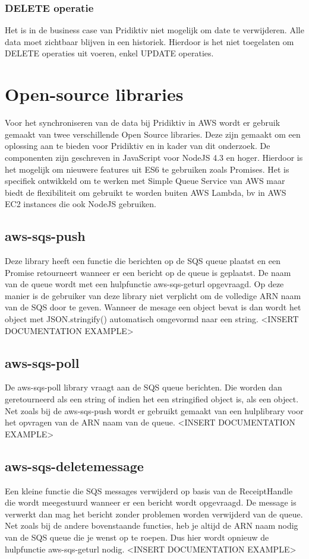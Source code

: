 \subsubsection{DELETE operatie}
Het is in de business case van Pridiktiv niet mogelijk om date te verwijderen. Alle data moet zichtbaar blijven in een historiek. Hierdoor is het niet toegelaten om DELETE operaties uit voeren, enkel UPDATE operaties. 
\section{Open-source libraries}
Voor het synchroniseren van de data bij Pridiktiv in AWS wordt er gebruik gemaakt van twee verschillende Open Source libraries. Deze zijn gemaakt om een oplossing aan te bieden voor Pridiktiv en in kader van dit onderzoek. De componenten zijn geschreven in JavaScript voor NodeJS 4.3 en hoger. Hierdoor is het mogelijk om nieuwere features uit ES6 te gebruiken zoals Promises. Het is specifiek ontwikkeld om te werken met Simple Queue Service van AWS maar biedt de flexibiliteit om gebruikt te worden buiten AWS Lambda, bv in AWS EC2 instances die ook NodeJS gebruiken.
\subsection{aws-sqs-push}
Deze library heeft een functie die berichten op de SQS queue plaatst en een Promise retourneert wanneer er een bericht op de queue is geplaatst. De naam van de queue wordt met een hulpfunctie aws-sqs-geturl opgevraagd. Op deze manier is de gebruiker van deze library niet verplicht om de volledige ARN naam van de SQS door te geven. Wanneer de mesage een object bevat is dan wordt het object met JSON.stringify() automatisch omgevormd naar een string.
<INSERT DOCUMENTATION EXAMPLE>
\subsection{aws-sqs-poll}
De aws-sqs-poll library vraagt aan de SQS queue berichten. Die worden dan geretourneerd als een string of indien het een stringified object is, als een object. Net zoals bij de aws-sqs-push wordt er gebruikt gemaakt van een hulplibrary voor het opvragen van de ARN naam van de queue.
<INSERT DOCUMENTATION EXAMPLE>
\subsection{aws-sqs-deletemessage}
Een kleine functie die SQS messages verwijderd op basis van de ReceiptHandle die wordt meegestuurd wanneer er een bericht wordt opgevraagd. De message is verwerkt dan mag het bericht zonder problemen worden verwijderd van de queue. Net zoals bij de andere bovenstaande functies, heb je altijd de ARN naam nodig van de SQS queue die je wenst op te roepen. Dus hier wordt opnieuw de hulpfunctie aws-sqs-geturl nodig.
<INSERT DOCUMENTATION EXAMPLE>
